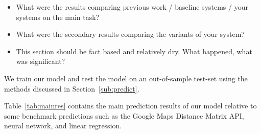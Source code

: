 \documentclass{article}
\begin{document}
{\color{gray}\begin{itemize}
\item What were the results comparing previous work / baseline systems / your systems on the main task?
\item What were the secondary results comparing the variants of your system?
\item This section should be fact based and relatively dry. What happened, what was significant?
\end{itemize}
}

We train our model and test the model on an out-of-sample test-set using the methods discussed in Section~\ref{sub:predict}. 

Table~\ref{tab:mainres} contains the main prediction results of our model relative to some benchmark predictions
such as the Google Maps Distance Matrix API, neural network, and linear regression. 
\end{document}
